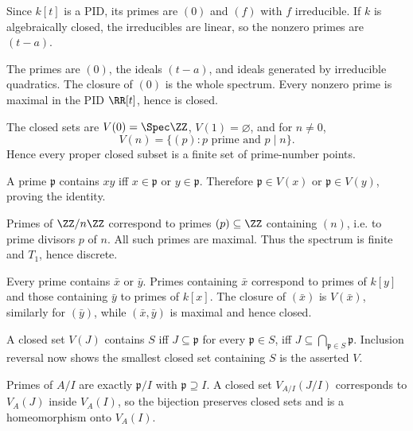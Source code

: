 \begin{solution}[VI.07.E8]
Since $k[t]$ is a PID, its primes are $(0)$ and $(f)$ with $f$ irreducible.  If $k$ is
algebraically closed, the irreducibles are linear, so the nonzero primes are $(t-a)$.
\end{solution}

\begin{solution}[VI.07.E9]
The primes are $(0)$, the ideals $(t-a)$, and ideals generated by irreducible quadratics.
The closure of $(0)$ is the whole spectrum.  Every nonzero prime is maximal in the PID
$\RR[t]$, hence is closed.
\end{solution}

\begin{solution}[VI.07.E10]
The closed sets are $V(0)=\Spec\ZZ$, $V(1)=\varnothing$, and for $n\neq0$,
\[
V(n)=\{(p):p\text{ prime and }p\mid n\}.
\]
Hence every proper closed subset is a finite set of prime-number points.
\end{solution}

\begin{solution}[VI.07.E11]
A prime $\mathfrak p$ contains $xy$ iff $x\in\mathfrak p$ or $y\in\mathfrak p$.
Therefore $\mathfrak p\in V(x)$ or $\mathfrak p\in V(y)$, proving the identity.
\end{solution}

\begin{solution}[VI.07.E12]
Primes of $\ZZ/n\ZZ$ correspond to primes $(p)\subseteq\ZZ$ containing $(n)$, i.e. to
prime divisors $p$ of $n$.  All such primes are maximal.  Thus the spectrum is finite and $T_1$,
hence discrete.
\end{solution}

\begin{solution}[VI.07.E13]
Every prime contains $\bar x$ or $\bar y$.  Primes containing $\bar x$ correspond to primes
of $k[y]$ and those containing $\bar y$ to primes of $k[x]$.  The closure of $(\bar x)$ is
$V(\bar x)$, similarly for $(\bar y)$, while $(\bar x,\bar y)$ is maximal and hence closed.
\end{solution}

\begin{solution}[VI.07.E14]
A closed set $V(J)$ contains $S$ iff $J\subseteq\mathfrak p$ for every $\mathfrak p\in S$,
iff $J\subseteq\bigcap_{\mathfrak p\in S}\mathfrak p$.  Inclusion reversal now shows the
smallest closed set containing $S$ is the asserted $V$.
\end{solution}

\begin{solution}[VI.07.E15]
Primes of $A/I$ are exactly $\mathfrak p/I$ with $\mathfrak p\supseteq I$.  A closed set
$V_{A/I}(J/I)$ corresponds to $V_A(J)$ inside $V_A(I)$, so the bijection preserves closed
sets and is a homeomorphism onto $V_A(I)$.
\end{solution}


